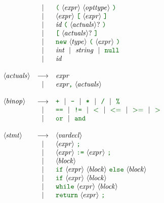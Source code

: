 \documentclass{article}
\newcommand{\Prod}{\longrightarrow}
\newcommand{\ntaX}[1]{\ensuremath{\textit{#1}}}
\newcommand{\VB}{\ |\ }
\newcommand{\tuple}[1]{\ensuremath{\langle #1 \rangle}}
\newcommand{\terminal}[1]{\textit{#1}}
\newcommand{\vterminal}[1]{\textsf{\textcolor{dgreen}{\texttt{#1}}}}
\newcommand{\nt}[1]{\ensuremath{\tuple{\hspace{-0.02cm}\ntaX{#1}\hspace{0.02cm}}}}
\newcommand{\ntq}[1]{\ensuremath{\tuple{\hspace{-0.02cm}\ntaX{#1}\hspace{0.02cm}}}?}
\newcommand{\nta}[1]{\nt{#1}}
\begin{document}
\[\begin{array}[t]{lcl}
               & \VB   & \vterminal{(}\ \nt{expr}\ \nt{opttype}\ \vterminal{)} \\
               & \VB   & \nt{expr}\ \vterminal{[}\ \nt{expr}\ \vterminal{]} \\
               & \VB   & \terminal{id}\ \vterminal{(}\ \ntq{actuals}\ \vterminal{)} \\
               & \VB   & \vterminal{[}\ \ntq{actuals}\ \vterminal{]} \\
               & \VB   & \vterminal{new}\ \nt{type}\ \vterminal{(}\ \nt{expr}\ \vterminal{)} \\
               & \VB   & \terminal{int}\ \VB\ \terminal{string}\ \VB\ \vterminal{null} \\
               & \VB   & \terminal{id} \\
    \\
    \nta{actuals} & \Prod & \terminal{expr} \\
                  & \VB   & \terminal{expr} \vterminal{,}\ \nt{actuals} \\
    \\
    \nta{binop} & \Prod &
    		\vterminal{+}
                \ \VB\ \vterminal{-}
                \ \VB\ \vterminal{*}
                \ \VB\ \vterminal{/}
                \ \VB\ \vterminal{\%}\\
                & \VB& \vterminal{==}
                \ \VB\ \vterminal{!=}
                \ \VB\ \vterminal{$<$}
                \ \VB\ \vterminal{$<=$}
                \ \VB\ \vterminal{$>=$}
                \ \VB\ \vterminal{$>$}
                \\
                & \VB& \vterminal{or}
                \ \VB\ \vterminal{and}\\
    \\
    \nta{stmt} & \Prod & \nt{vardecl} \\
               & \VB   & \nt{expr}\ \vterminal{;} \\
               & \VB   & \nt{expr}\ \vterminal{:=}\ \nt{expr}\ \vterminal{;} \\
               & \VB   & \nt{block} \\
               & \VB   & \vterminal{if}\ \nt{expr}\ \nt{block}\ \vterminal{else}\ \nt{block} \\
               & \VB   & \vterminal{if}\ \nt{expr}\ \nt{block}\ \\
               & \VB   & \vterminal{while}\ \nt{expr}\ \nt{block} \\
               & \VB   & \vterminal{return}\ \nt{expr}\ \vterminal{;} \\
  \end{array}
\]
\end{document}

